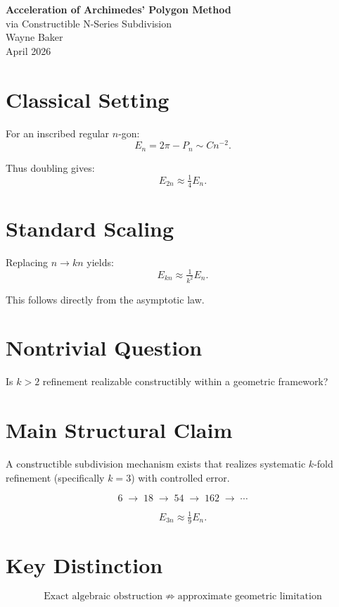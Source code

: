 \documentclass[12pt]{article}
\begin{document}
\begin{center}
{\LARGE \textbf{Acceleration of Archimedes' Polygon Method}}\\[4pt]
{\large via Constructible N-Series Subdivision}\\[10pt]
{\normalsize Wayne Baker}\\
{\small April 2026}
\end{center}

\vspace{8pt}

\section*{Classical Setting}

For an inscribed regular $n$-gon:
\[
E_n = 2\pi - P_n \sim C n^{-2}.
\]

Thus doubling gives:
\[
E_{2n} \approx \tfrac{1}{4} E_n.
\]

\section*{Standard Scaling}

Replacing $n \to kn$ yields:
\[
E_{kn} \approx \tfrac{1}{k^2} E_n.
\]

This follows directly from the asymptotic law.

\section*{Nontrivial Question}

Is $k>2$ refinement realizable constructibly within a geometric framework?

\section*{Main Structural Claim}

A constructible subdivision mechanism exists that realizes
systematic $k$-fold refinement (specifically $k=3$) with controlled error.

\[
6 \;\to\; 18 \;\to\; 54 \;\to\; 162 \;\to\; \cdots
\]

\[
E_{3n} \approx \tfrac{1}{9} E_n.
\]
\newpage
\section*{Key Distinction}

\[
\text{Exact algebraic obstruction}
\;\not\Rightarrow\;
\text{approximate geometric limitation}
\]
\end{document}

